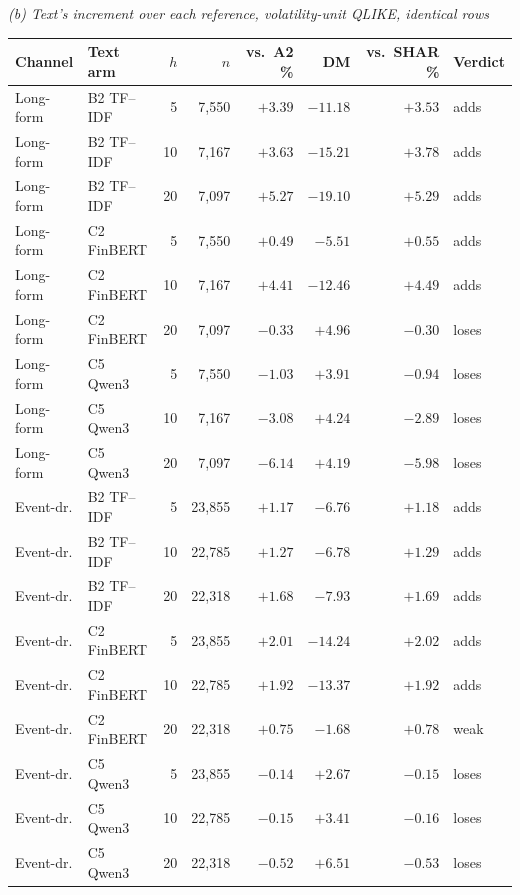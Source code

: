 \begin{table}[htbp]
\vspace{1.2ex}
\emph{(b) Text's increment over each reference, volatility-unit QLIKE, identical rows}\\[0.4ex]
\begin{tabular}{@{}llrrrrrl@{}}
\toprule
Channel & Text arm & $h$ & $n$ & vs.\ A2 \% & DM & vs.\ SHAR \% & Verdict \\
\midrule
Long-form & B2 TF--IDF   &  5 & 7{,}550  & $+3.39$ & $-11.18$ & $+3.53$ & adds \\
Long-form & B2 TF--IDF   & 10 & 7{,}167  & $+3.63$ & $-15.21$ & $+3.78$ & adds \\
Long-form & B2 TF--IDF   & 20 & 7{,}097  & $+5.27$ & $-19.10$ & $+5.29$ & adds \\
Long-form & C2 FinBERT   &  5 & 7{,}550  & $+0.49$ & $-5.51$  & $+0.55$ & adds \\
Long-form & C2 FinBERT   & 10 & 7{,}167  & $+4.41$ & $-12.46$ & $+4.49$ & adds \\
Long-form & C2 FinBERT   & 20 & 7{,}097  & $-0.33$ & $+4.96$  & $-0.30$ & loses \\
Long-form & C5 Qwen3     &  5 & 7{,}550  & $-1.03$ & $+3.91$  & $-0.94$ & loses \\
Long-form & C5 Qwen3     & 10 & 7{,}167  & $-3.08$ & $+4.24$  & $-2.89$ & loses \\
Long-form & C5 Qwen3     & 20 & 7{,}097  & $-6.14$ & $+4.19$  & $-5.98$ & loses \\
Event-dr. & B2 TF--IDF   &  5 & 23{,}855 & $+1.17$ & $-6.76$  & $+1.18$ & adds \\
Event-dr. & B2 TF--IDF   & 10 & 22{,}785 & $+1.27$ & $-6.78$  & $+1.29$ & adds \\
Event-dr. & B2 TF--IDF   & 20 & 22{,}318 & $+1.68$ & $-7.93$  & $+1.69$ & adds \\
Event-dr. & C2 FinBERT   &  5 & 23{,}855 & $+2.01$ & $-14.24$ & $+2.02$ & adds \\
Event-dr. & C2 FinBERT   & 10 & 22{,}785 & $+1.92$ & $-13.37$ & $+1.92$ & adds \\
Event-dr. & C2 FinBERT   & 20 & 22{,}318 & $+0.75$ & $-1.68$  & $+0.78$ & weak \\
Event-dr. & C5 Qwen3     &  5 & 23{,}855 & $-0.14$ & $+2.67$  & $-0.15$ & loses \\
Event-dr. & C5 Qwen3     & 10 & 22{,}785 & $-0.15$ & $+3.41$  & $-0.16$ & loses \\
Event-dr. & C5 Qwen3     & 20 & 22{,}318 & $-0.52$ & $+6.51$  & $-0.53$ & loses \\
\bottomrule
\end{tabular}
\end{table}

